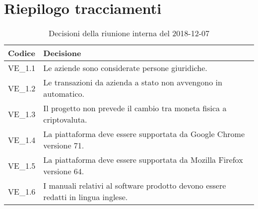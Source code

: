 \pagebreak

\section{Riepilogo tracciamenti}

	
\begin{longtable}{ >{\centering}p{} >{}p{}}
	\caption{Decisioni della riunione interna del 2018-12-07}\\	
	\rowcolorhead
	\textbf{\color{white}Codice} 
	& \centering\textbf{\color{white}Decisione} 
	\tabularnewline 
	\endfirsthead
		VE\_1.1 & Le aziende sono considerate persone giuridiche.
		
		\tabularnewline 
		VE\_1.2 & Le transazioni da azienda a stato non avvengono in automatico.
		
		\tabularnewline 
		VE\_1.3 & Il progetto non prevede il cambio tra moneta fisica a criptovaluta.
	
		\tabularnewline 
		VE\_1.4 & La piattaforma deve essere supportata da Google 
		Chrome versione 71.
		
		\tabularnewline 
		VE\_1.5 & La piattaforma deve essere supportata da Mozilla 
		Firefox versione 64.
		
		\tabularnewline 
		VE\_1.6 & I manuali relativi al software prodotto devono essere redatti 
		in lingua inglese.
	
	\end{longtable}

